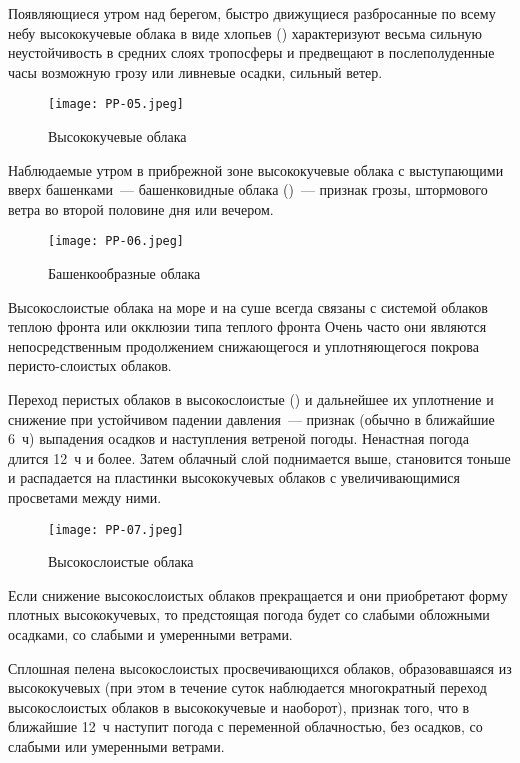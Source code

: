  Появляющиеся утром над берегом, быстро движущиеся разбросанные по
всему небу высококучевые облака в виде хлопьев () характеризуют
весьма сильную неустойчивость в средних слоях тропосферы и предвещают
в послеполуденные часы возможную грозу или ливневые осадки, сильный
ветер.

\begin{figure}[htb]
  \centering{}
  \texttt{[image: PP-05.jpeg]}
  \caption{Высококучевые облака}
  \label{fig:pp05}
  \small
  \centering{}
\end{figure}

 Наблюдаемые утром в прибрежной зоне высококучевые облака с
выступающими вверх башенками~--- башенковидные облака ()~--- признак
грозы, штормового ветра во второй половине дня или вечером.

\begin{figure}[htb]
  \centering{}
  \texttt{[image: PP-06.jpeg]}
  \caption{Башенкообразные облака}
  \label{fig:pp06}
  \small
  \centering{}
\end{figure}

Высокослоистые облака на море и на суше всегда связаны с системой
облаков теплою фронта или окклюзии типа теплого фронта Очень часто они
являются непосредственным продолжением снижающегося и уплотняющегося
покрова перисто-слоистых облаков.

 Переход перистых облаков в высокослоистые () и
дальнейшее их уплотнение и снижение при устойчивом падении
давления~--- признак (обычно в ближайшие 6~ч) выпадения
осадков и наступления ветреной погоды. Ненастная погода длится 12~ч и
более. Затем облачный слой поднимается выше, становится тоньше и
распадается на пластинки высококучевых облаков с увеличивающимися
просветами между ними.

\begin{figure}[htb]
  \centering{}
  \texttt{[image: PP-07.jpeg]}
  \caption{Высокослоистые облака}
  \label{fig:pp07}
  \small
  \centering{}
\end{figure}

 Если снижение высокослоистых облаков прекращается и они
приобретают форму плотных высококучевых, то предстоящая погода будет
со слабыми обложными осадками, со слабыми и умеренными ветрами.

 Сплошная пелена высокослоистых просвечивающихся облаков,
образовавшаяся из высококучевых (при этом в течение суток наблюдается
многократный переход высокослоистых облаков в высококучевые и
наоборот), признак того, что в ближайшие 12~ч наступит погода
с переменной облачностью, без осадков, со слабыми или умеренными
ветрами.

